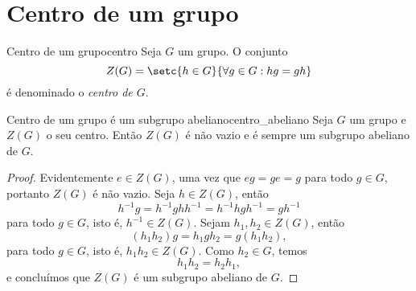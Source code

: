 \section{Centro de um grupo}
\begin{definition}{Centro de um grupo}{centro}
    Seja \(G\) um grupo. O conjunto
    \begin{equation*}
        Z(G) = \setc{h \in G}{\forall g \in G: hg = gh}
    \end{equation*}
    é denominado o \emph{centro de \(G\)}.
\end{definition}

\begin{proposition}{Centro de um grupo é um subgrupo abeliano}{centro_abeliano}
    Seja \(G\) um grupo e \(Z(G)\) o seu centro. Então \(Z(G)\) é não vazio e é sempre um subgrupo abeliano de \(G\).
\end{proposition}
\begin{proof}
    Evidentemente \(e \in Z(G)\), uma vez que \(eg = ge = g\) para todo \(g \in G\), portanto \(Z(G)\) é não vazio. Seja \(h \in Z(G)\), então
    \begin{equation*}
        h^{-1} g = h^{-1} g h h^{-1} = h^{-1} h g h^{-1} = g h^{-1}
    \end{equation*}
    para todo \(g \in G\), isto é, \(h^{-1} \in Z(G)\). Sejam \(h_1, h_2 \in Z(G)\), então
    \begin{equation*}
        (h_1 h_2) g = h_1 g h_2 = g(h_1 h_2),
    \end{equation*}
    para todo \(g \in G\), isto é, \(h_1 h_2 \in Z(G)\). Como \(h_2 \in G\), temos
    \begin{equation*}
        h_1 h_2 = h_2 h_1,
    \end{equation*}
    e concluímos que \(Z(G)\) é um subgrupo abeliano de \(G\).
\end{proof}

